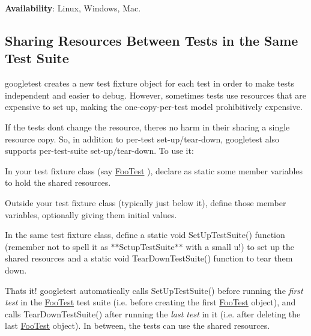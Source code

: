 {\bfseries{Availability}}\+: Linux, Windows, Mac.

\subsection*{Sharing Resources Between Tests in the Same Test Suite}

googletest creates a new test fixture object for each test in order to make tests independent and easier to debug. However, sometimes tests use resources that are expensive to set up, making the one-\/copy-\/per-\/test model prohibitively expensive.

If the tests don\textquotesingle{}t change the resource, there\textquotesingle{}s no harm in their sharing a single resource copy. So, in addition to per-\/test set-\/up/tear-\/down, googletest also supports per-\/test-\/suite set-\/up/tear-\/down. To use it\+:


\begin{DoxyEnumerate}
\item In your test fixture class (say {\ttfamily \mbox{\hyperlink{class_foo_test}{Foo\+Test}}} ), declare as {\ttfamily static} some member variables to hold the shared resources.
\end{DoxyEnumerate}
\begin{DoxyEnumerate}
\item Outside your test fixture class (typically just below it), define those member variables, optionally giving them initial values.
\end{DoxyEnumerate}
\begin{DoxyEnumerate}
\item In the same test fixture class, define a {\ttfamily static void Set\+Up\+Test\+Suite()} function (remember not to spell it as $\ast$$\ast${\ttfamily Setup\+Test\+Suite}$\ast$$\ast$ with a small {\ttfamily u}!) to set up the shared resources and a {\ttfamily static void Tear\+Down\+Test\+Suite()} function to tear them down.
\end{DoxyEnumerate}

That\textquotesingle{}s it! googletest automatically calls {\ttfamily Set\+Up\+Test\+Suite()} before running the {\itshape first test} in the {\ttfamily \mbox{\hyperlink{class_foo_test}{Foo\+Test}}} test suite (i.\+e. before creating the first {\ttfamily \mbox{\hyperlink{class_foo_test}{Foo\+Test}}} object), and calls {\ttfamily Tear\+Down\+Test\+Suite()} after running the {\itshape last test} in it (i.\+e. after deleting the last {\ttfamily \mbox{\hyperlink{class_foo_test}{Foo\+Test}}} object). In between, the tests can use the shared resources.

